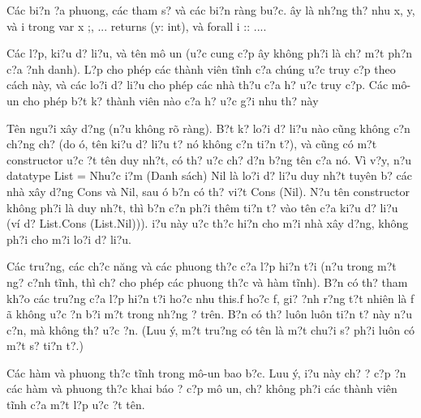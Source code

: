 \documentclass{article} %
\begin{document}
\noindent 

C\'{a}c bi?n {\dj}?a phuong, c\'{a}c tham s? v\`{a} c\'{a}c bi?n r\`{a}ng bu?c. {\DJ}\^{a}y l\`{a} nh?ng th? nhu x, y, v\`{a} i trong var x ;, ... returns (y: int), v\`{a} forall i :: ....

C\'{a}c l?p, ki?u d? li?u, v\`{a} t\^{e}n m\^{o} {\dj}un ({\dj}u?c cung c?p {\dj}\^{a}y kh\^{o}ng ph?i l\`{a} ch? m?t ph?n c?a {\dj}?nh danh). L?p cho ph\'{e}p c\'{a}c th\`{a}nh vi\^{e}n t\~{i}nh c?a ch\'{u}ng {\dj}u?c truy c?p theo c\'{a}ch n\`{a}y, v\`{a} c\'{a}c lo?i d? li?u cho ph\'{e}p c\'{a}c nh\`{a} th?u c?a h? {\dj}u?c truy c?p. C\'{a}c m\^{o}-{\dj}un cho ph\'{e}p b?t k? th\`{a}nh vi\^{e}n n\`{a}o c?a h? {\dj}u?c g?i nhu th? n\`{a}y

T\^{e}n ngu?i x\^{a}y d?ng (n?u kh\^{o}ng r\~{o} r\`{a}ng). B?t k? lo?i d? li?u n\`{a}o c\~{u}ng kh\^{o}ng c?n ch?ng ch? (do {\dj}\'{o}, t\^{e}n ki?u d? li?u t? n\'{o} kh\^{o}ng c?n ti?n t?), v\`{a} c\~{u}ng c\'{o} m?t constructor {\dj}u?c {\dj}?t t\^{e}n duy nh?t, c\'{o} th? {\dj}u?c ch? d?n b?ng t\^{e}n c?a n\'{o}. V\`{i} v?y, n?u datatype List = Nhu?c {\dj}i?m (Danh s\'{a}ch) {\textbar} Nil l\`{a} lo?i d? li?u duy nh?t tuy\^{e}n b? c\'{a}c nh\`{a} x\^{a}y d?ng Cons v\`{a} Nil, sau {\dj}\'{o} b?n c\'{o} th? vi?t Cons (Nil). N?u t\^{e}n constructor kh\^{o}ng ph?i l\`{a} duy nh?t, th\`{i} b?n c?n ph?i th\^{e}m ti?n t? v\`{a}o t\^{e}n c?a ki?u d? li?u (v\'{i} d? List.Cons (List.Nil))). {\DJ}i?u n\`{a}y {\dj}u?c th?c hi?n cho m?i nh\`{a} x\^{a}y d?ng, kh\^{o}ng ph?i cho m?i lo?i d? li?u.

C\'{a}c tru?ng, c\'{a}c ch?c n\u{a}ng v\`{a} c\'{a}c phuong th?c c?a l?p hi?n t?i (n?u trong m?t ng? c?nh t\~{i}nh, th\`{i} ch? cho ph\'{e}p c\'{a}c phuong th?c v\`{a} h\`{a}m t\~{i}nh). B?n c\'{o} th? tham kh?o c\'{a}c tru?ng c?a l?p hi?n t?i ho?c nhu this.f ho?c f, gi? {\dj}?nh r?ng t?t nhi\^{e}n l\`{a} f {\dj}\~{a} kh\^{o}ng {\dj}u?c ?n b?i m?t trong nh?ng ? tr\^{e}n. B?n c\'{o} th? lu\^{o}n lu\^{o}n ti?n t? n\`{a}y n?u c?n, m\`{a} kh\^{o}ng th? {\dj}u?c ?n. (Luu \'{y}, m?t tru?ng c\'{o} t\^{e}n l\`{a} m?t chu?i s? ph?i lu\^{o}n c\'{o} m?t s? ti?n t?.)

\noindent C\'{a}c h\`{a}m v\`{a} phuong th?c t\~{i}nh trong m\^{o}-{\dj}un bao b?c. Luu \'{y}, {\dj}i?u n\`{a}y ch? {\dj}? c?p {\dj}?n c\'{a}c h\`{a}m v\`{a} phuong th?c khai b\'{a}o ? c?p m\^{o} {\dj}un, ch? kh\^{o}ng ph?i c\'{a}c th\`{a}nh vi\^{e}n t\~{i}nh c?a m?t l?p {\dj}u?c {\dj}?t t\^{e}n.
\end{document}
